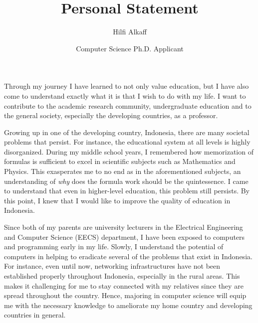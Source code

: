 \documentclass[12pt]{article}
\title{Personal Statement}
\author{Hilfi Alkaff}
\date{Computer Science Ph.D. Applicant}
\begin{document}
  \maketitle%

Through my journey I have learned to not only value education, but I have also come to understand exactly what it is that I wish to do with my life. I want to contribute to the academic research community, undergraduate education and to the general society, especially the developing countries, as a professor. \newline

Growing up in one of the developing country, Indonesia, there are many societal problems that persist. For instance, the educational system at all levels is highly disorganized. During my middle school years, I remembered how memorization of formulas is sufficient to excel in scientific subjects such as Mathematics and Physics. This exasperates me to no end as in the aforementioned subjects, an understanding of \textit{why} does the formula work should be the quintessence. I came to understand that even in higher-level education, this problem still persists. By this point, I knew that I would like to improve the quality of education in Indonesia. \newline

Since both of my parents are university lecturers in the Electrical Engineering and Computer Science (EECS) department, I have been exposed to computers and programming early in my life. Slowly, I understand the potential of computers in helping to eradicate several of the problems that exist in Indonesia. For instance, even until now, networking infrastructures have not been established properly throughout Indonesia, especially in the rural areas. This makes it challenging for me to stay connected with my relatives since they are spread throughout the country. Hence, majoring in computer science will equip me with the necessary knowledge to ameliorate my home country and developing countries in general. \newline

\end{document}

